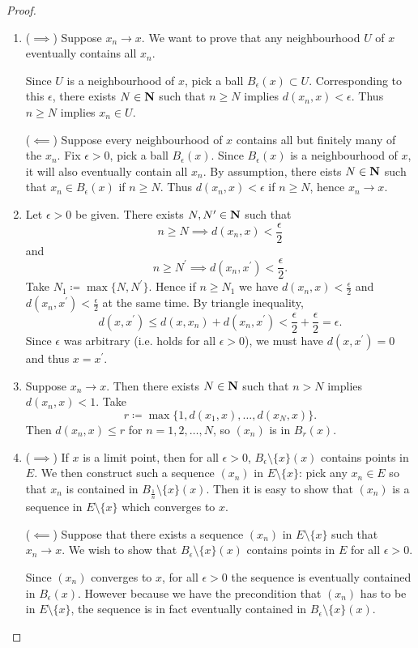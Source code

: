 \begin{proof} \
\begin{enumerate}[label=(\arabic*)]
\item ($\implies$) Suppose $x_n\to x$. We want to prove that any neighbourhood $U$ of $x$ eventually contains all $x_n$.

Since $U$ is a neighbourhood of $x$, pick a ball $B_\epsilon(x)\subset U$. Corresponding to this $\epsilon$, there exists $N\in\mathbf N$ such that $n\ge N$ implies $d(x_n,x)<\epsilon$. Thus $n\ge N$ implies $x_n\in U$.

($\impliedby$) Suppose every neighbourhood of $x$ contains all but finitely many of the $x_n$. Fix $\epsilon>0$, pick a ball $B_\epsilon(x)$. Since $B_\epsilon(x)$ is a neighbourhood of $x$, it will also eventually contain all $x_n$. By assumption, there eists $N\in\mathbf N$ such that $x_n\in B_\epsilon(x)$ if $n\ge N$. Thus $d(x_n,x)<\epsilon$ if $n\ge N$, hence $x_n\to x$.

\item Let $\epsilon>0$ be given. There exists $N,N^\prime\in\mathbf N$ such that
\[n\ge N\implies d(x_n,x)<\frac{\epsilon}{2}\]
and
\[n\ge N^\prime\implies d(x_n,x^\prime)<\frac{\epsilon}{2}.\]
Take $N_1\coloneqq\max\{N,N^\prime\}$. Hence if $n\ge N_1$ we have $d(x_n,x)<\frac{\epsilon}{2}$ and $d(x_n,x^\prime)<\frac{\epsilon}{2}$ at the same time. By triangle inequality,
\[ d(x,x^\prime)\le d(x,x_n)+d(x_n,x^\prime)<\frac{\epsilon}{2}+\frac{\epsilon}{2}=\epsilon.\]
Since $\epsilon$ was arbitrary (i.e. holds for all $\epsilon>0$), we must have $d(x,x^\prime)=0$ and thus $x=x^\prime$.

\item Suppose $x_n\to x$. Then there exists $N\in\mathbf N$ such that $n>N$ implies $d(x_n,x)<1$. Take
\[r\coloneqq\max\{1,d(x_1,x),\dots,d(x_N,x)\}.\]
Then $d(x_n,x)\le r$ for $n=1,2,\dots,N$, so $(x_n)$ is in $B_r(x)$.

\item ($\implies$) If $x$ is a limit point, then for all $\epsilon>0$, $B_\epsilon\setminus\{x\}(x)$ contains points in $E$. We then construct such a sequence $(x_n)$ in $E\setminus\{x\}$: pick any $x_n\in E$ so that $x_n$ is contained in $B_\frac{1}{n}\setminus\{x\}(x)$. Then it is easy to show that $(x_n)$ is a sequence in $E\setminus\{x\}$ which converges to $x$.

($\impliedby$) Suppose that there exists a sequence $(x_n)$ in $E\setminus\{x\}$ such that $x_n\to x$. We wish to show that $B_\epsilon\setminus\{x\}(x)$ contains points in $E$ for all $\epsilon>0$.

Since $(x_n)$ converges to $x$, for all $\epsilon>0$ the sequence is eventually contained in $B_\epsilon(x)$. However because we have the precondition that $(x_n)$ has to be in $E\setminus\{x\}$, the sequence is in fact eventually contained in $B_\epsilon\setminus\{x\}(x)$.
\end{enumerate}
\end{proof}

